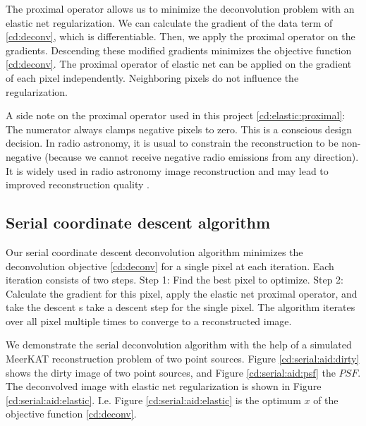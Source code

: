 The proximal operator allows us to minimize the deconvolution problem with an elastic net regularization. We can calculate the gradient of the data term of \eqref{cd:deconv}, which is differentiable. Then, we apply the proximal operator on the gradients. Descending these modified gradients minimizes the objective function \eqref{cd:deconv}. The proximal operator of elastic net can be applied on the gradient of each pixel independently. Neighboring pixels do not influence the regularization.

A side note on the proximal operator used in this project \eqref{cd:elastic:proximal}: The numerator always clamps negative pixels to zero. This is a conscious design decision. In radio astronomy, it is usual to constrain the reconstruction to be non-negative (because we cannot receive negative radio emissions from any direction). It is widely used in radio astronomy image reconstruction and may lead to improved reconstruction quality \cite{mcewen2011compressed}.


\subsection{Serial coordinate descent algorithm}\label{cd:serial}
Our serial coordinate descent deconvolution algorithm minimizes the deconvolution objective \eqref{cd:deconv} for a single pixel at each iteration. Each iteration consists of two steps. Step 1: Find the best pixel to optimize. Step 2: Calculate the gradient for this pixel, apply the elastic net proximal operator, and take the descent s take a descent step for the single pixel. The algorithm iterates over all pixel multiple times to converge to a reconstructed image.

We demonstrate the serial deconvolution algorithm with the help of a simulated MeerKAT reconstruction problem of two point sources. Figure \ref{cd:serial:aid:dirty} shows the dirty image of two point sources, and Figure \ref{cd:serial:aid:psf} the $PSF$. The deconvolved image with elastic net regularization is shown in Figure \ref{cd:serial:aid:elastic}. I.e. Figure \ref{cd:serial:aid:elastic} is the optimum $x$ of the objective function \eqref{cd:deconv}.

